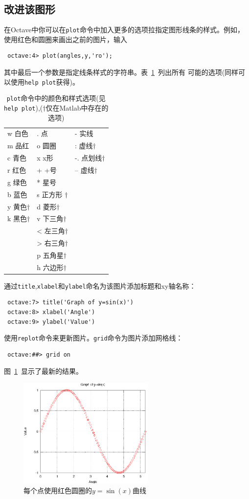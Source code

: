 \documentclass[UTF8,adobefonts]{ctexart}
\begin{document}
\subsection{改进该图形}
在Octave中你可以在{\tt plot}命令中加入更多的选项拉指定图形线条的样式。例如，
使用红色和圆圈来画出之前的图片，输入
\begin{verbatim}
 octave:4> plot(angles,y,'ro');
\end{verbatim}
其中最后一个参数是指定线条样式的字符串。表~\ref{tab:style}~列出所有
可能的选项(同样可以使用{\tt help plot}获得)。
\begin{table}
\centering
\caption{{\tt plot}命令中的颜色和样式选项(见{\tt help plot}),($\dag$仅在Matlab中存在的选项)}
\label{tab:style}
 \begin{tabular}{|l|l|l|}
  \hline
 w 白色 & . 点 & - 实线 \\
 m 品红 & o 圆圈 & : 虚线$\dag$ \\
 c 青色 & x x形 & -. 点划线$\dag$ \\
 r 红色 & + +号 & -- 虚线$\dag$ \\
 g 绿色 & * 星号 & \\
 b 蓝色 & s 正方形 $\dag$& \\
 y 黄色$\dag$ & d 菱形$\dag$ & \\
 k 黑色$\dag$& v 下三角$\dag$ & \\
 & < 左三角$\dag$ & \\
 & > 右三角$\dag$ & \\
 & p 五角星$\dag$ & \\
 & h 六边形$\dag$ & \\
\hline
 \end{tabular}
\end{table}
通过{\tt title},{\tt xlabel}和{\tt ylabel}命名为该图片添加标题和xy轴名称：
\begin{verbatim}
 octave:7> title('Graph of y=sin(x)')
 octave:8> xlabel('Angle')
 octave:9> ylabel('Value')
\end{verbatim}
使用{\tt replot}命令来更新图片。{\tt grid}命令为图片添加网格线：
\begin{verbatim}
 octave:##> grid on
\end{verbatim}
图~\ref{improvedsinx}~显示了最新的结果。
\begin{figure}
 \centering
 \includegraphics[width=0.6\textwidth]{improvedsinx.eps}
 \caption{每个点使用红色圆圈的$y=\sin(x)曲线$}
  \label{improvedsinx}
\end{figure}
\end{document}
